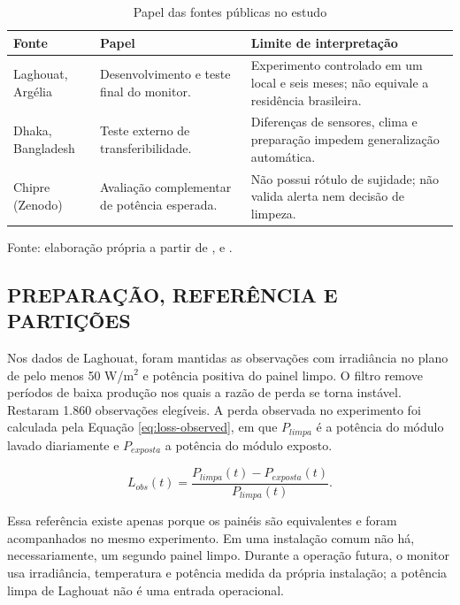\documentclass{UNESC}
\begin{document}
\begin{table}[htbp]
\centering
\caption{Papel das fontes públicas no estudo}
\label{tab:fontes}
\small
\begingroup
\setlength{\tabcolsep}{1.5pt}
\begin{tabularx}{\linewidth}{@{}>{\raggedright\arraybackslash}p{2.8cm}>{\raggedright\arraybackslash}p{3.0cm}>{\raggedright\arraybackslash}X@{}}
\toprule
Fonte & Papel & Limite de interpretação \\
\midrule
Laghouat, Argélia & Desenvolvimento e teste final do monitor. & Experimento controlado em um local e seis meses; não equivale a residência brasileira. \\
Dhaka, Bangladesh & Teste externo de transferibilidade. & Diferenças de sensores, clima e preparação impedem generalização automática. \\
Chipre (Zenodo) & Avaliação complementar de potência esperada. & Não possui rótulo de sujidade; não valida alerta nem decisão de limpeza. \\
\bottomrule
\end{tabularx}
\endgroup
\par\smallskip\raggedright\footnotesize Fonte: elaboração própria a partir de ,  e .
\end{table}

\subsection{PREPARAÇÃO, REFERÊNCIA E PARTIÇÕES}

Nos dados de Laghouat, foram mantidas as observações com irradiância no plano de pelo menos 50 W/m$^2$ e potência positiva do painel limpo. O filtro remove períodos de baixa produção nos quais a razão de perda se torna instável. Restaram 1.860 observações elegíveis. A perda observada no experimento foi calculada pela Equação \ref{eq:loss-observed}, em que $P_{limpa}$ é a potência do módulo lavado diariamente e $P_{exposta}$ a potência do módulo exposto.

\begin{equation}
L_{obs}(t)=\frac{P_{limpa}(t)-P_{exposta}(t)}{P_{limpa}(t)}.
\label{eq:loss-observed}
\end{equation}

Essa referência existe apenas porque os painéis são equivalentes e foram acompanhados no mesmo experimento. Em uma instalação comum não há, necessariamente, um segundo painel limpo. Durante a operação futura, o monitor usa irradiância, temperatura e potência medida da própria instalação; a potência limpa de Laghouat não é uma entrada operacional.
\end{document}
